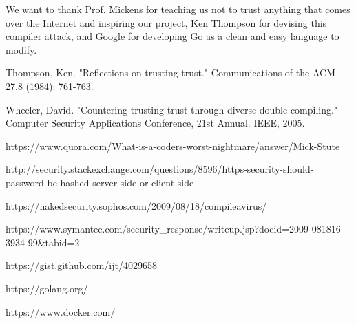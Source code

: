 \documentclass[10pt]{sigplanconf}
\begin{document}
\acks

We want to thank Prof. Mickens for teaching us not to trust anything that comes over the Internet and inspiring our project, Ken Thompson for devising this compiler attack, and Google for developing Go as a clean and easy language to modify.





\begin{thebibliography}{}
\softraggedright

Thompson, Ken. "Reflections on trusting trust." Communications of the ACM 27.8 (1984): 761-763.

Wheeler, David. "Countering trusting trust through diverse double-compiling." Computer Security Applications Conference, 21st Annual. IEEE, 2005.

https://www.quora.com/What-is-a-coders-worst-nightmare/answer/Mick-Stute

http://security.stackexchange.com/questions/8596/https-security-should-password-be-hashed-server-side-or-client-side

https://nakedsecurity.sophos.com/2009/08/18/compileavirus/

https://www.symantec.com/security\_response/writeup.jsp?docid=2009-081816-3934-99\&tabid=2

https://gist.github.com/ijt/4029658

https://golang.org/

https://www.docker.com/
\end{thebibliography}
\end{document}
